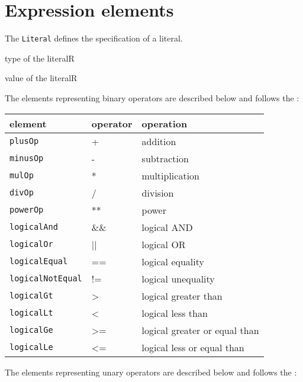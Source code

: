 \section{Expression elements}


The {\tt Literal} defines the specification of a literal.

\begin{HIRChildElements}
	{type of the literal}{R}
\end{HIRChildElements}

\begin{HIRAttributes}
	{value of the literal}{R}
\end{HIRAttributes}


The elements representing binary operators are described below and follows the
: 

\begin{tabular}{|l|p{4cm}|l|}
	\hline
	 element & operator & operation \\ \hline\hline
	 {\tt plusOp} & + & addition \\ \hline 
	 {\tt minusOp} & - & subtraction \\ \hline 
	 {\tt mulOp} & * & multiplication \\ \hline 
	 {\tt divOp} & / & division \\ \hline 
	 {\tt powerOp} & ** & power \\ \hline 
	 {\tt logicalAnd} & \&\& & logical AND \\ \hline 
	 {\tt logicalOr} & || & logical OR \\ \hline 
	 {\tt logicalEqual} & == & logical equality \\ \hline 
	 {\tt logicalNotEqual} & != & logical unequality \\ \hline 
	 {\tt logicalGt} & > & logical greater than \\ \hline 
	 {\tt logicalLt} & < & logical less than \\ \hline 
	 {\tt logicalGe} & >= & logical greater or equal than \\ \hline 
	 {\tt logicalLe} & <= & logical less or equal than \\ \hline 
\end{tabular}



The elements representing unary operators are described below and follows the
:


